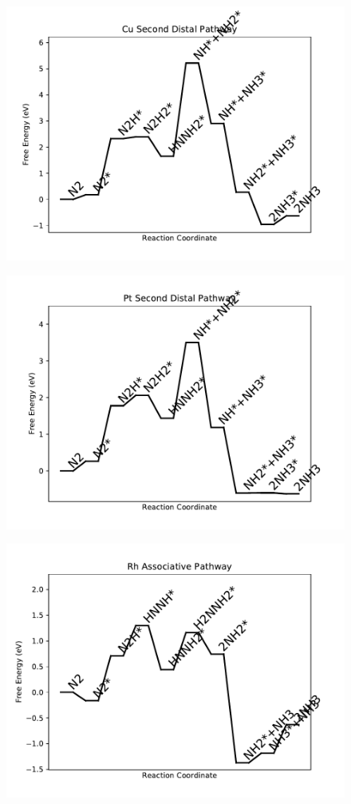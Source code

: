 \begin{figure}
\includegraphics[width=0.8\linewidth]{data/plots/Cu_distal_2.pdf}
\end{figure}

\begin{figure}
\includegraphics[width=0.8\linewidth]{data/plots/Pt_distal_2.pdf}
\end{figure}

\begin{figure}
\includegraphics[width=0.8\linewidth]{data/plots/Rh_associative.pdf}
\end{figure}


